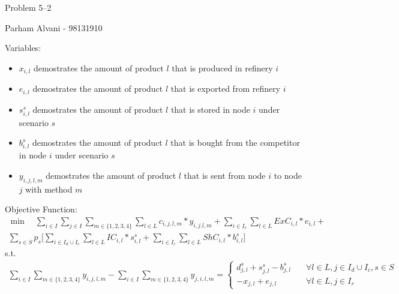 \documentclass{article}
\begin{document}
\large %


{\Large Problem 5--2 %
\hfill  }

\begin{center}
{\Large Parham Alvani - 98131910} %
\end{center}
\vspace{0.05in}


\par
Variables:
\begin{itemize}
        \item \(x_{i,l}\) demostrates the amount of product \(l\) that is produced in refinery \(i\)
        \item \(e_{i,l}\) demostrates the amount of product \(l\) that is exported from refinery \(i\)
        \item \(s_{i,l}^s\) demostrates the amount of product \(l\) that is stored in node \(i\) under scenario \(s\)
        \item \(b_{i,l}^s\) demostrates the amount of product \(l\) that is bought from the competitor in node \(i\) under scenario \(s\)
        \item \(y_{i,j,l,m}\) demostrates the amount of product \(l\) that is sent from node \(i\) to node \(j\) with method \(m\)
\end{itemize}
\par
Objective Function:
\begin{align*}
    \min \quad \sum_{i \in I}\sum_{j \in I}\sum_{m \in \{1,2,3,4\}}\sum_{l \in L} c_{i,j,l,m} * y_{i,j.l,m} + \sum_{i \in I_r}\sum_{l \in L} ExC_{i,l} * e_{i,l} + \\
    \sum_{s \in S} p_s \big[ \sum_{i \in I_d \cup I_c} \sum_{l \in L} IC_{i,l} * s_{i,l}^s + \sum_{i \in I_c} \sum_{l \in L} ShC_{i,l} * b_{i,l}^s \big]
\end{align*}
s.t.
\begin{align*}
        \sum_{i \in I} \sum_{m \in \{1,2,3,4\}} y_{i,j,l,m} - \sum_{i \in I} \sum_{m \in \{1,2,3,4\}} y_{j,i,l,m} =
        \begin{cases}
                d_{j,l}^s + s_{j,l}^s - b_{j,l}^s &\quad \forall l \in L, j \in I_d \cup I_c, s \in S \\
                -x_{j,l} + e_{j,l} &\quad \forall l \in L, j \in I_r
        \end{cases}
\end{align*}
\end{document}

